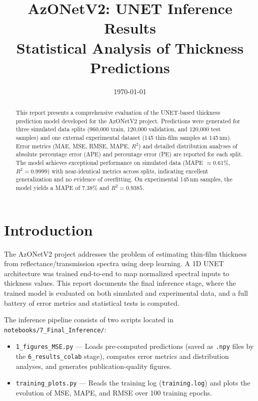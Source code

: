 \documentclass[11pt,a4paper]{article}
\title{AzONetV2: UNET Inference Results \\ {\normalsize Statistical Analysis of Thickness Predictions}}
\author{}
\date{\today}
\begin{document}
\maketitle

\begin{abstract}
This report presents a comprehensive evaluation of the UNET-based thickness prediction model developed for the AzONetV2 project. Predictions were generated for three simulated data splits (960,000 train, 120,000 validation, and 120,000 test samples) and one external experimental dataset (145 thin-film samples at 145\,nm). Error metrics (MAE, MSE, RMSE, MAPE, $R^2$) and detailed distribution analyses of absolute percentage error (APE) and percentage error (PE) are reported for each split. The model achieves exceptional performance on simulated data (MAPE $\approx 0.61\%$, $R^2 = 0.9999$) with near-identical metrics across splits, indicating excellent generalization and no evidence of overfitting. On experimental 145\,nm samples, the model yields a MAPE of 7.38\% and $R^2 = 0.9385$.
\end{abstract}

\setcounter{tocdepth}{1}
\tableofcontents
\newpage

\section{Introduction}

The AzONetV2 project addresses the problem of estimating thin-film thickness from reflectance/transmission spectra using deep learning. A 1D UNET architecture was trained end-to-end to map normalized spectral inputs to thickness values. This report documents the final inference stage, where the trained model is evaluated on both simulated and experimental data, and a full battery of error metrics and statistical tests is computed.

The inference pipeline consists of two scripts located in \texttt{notebooks/7\_Final\_Inference/}:

\begin{itemize}
  \item \texttt{1\_figures\_MSE.py} — Loads pre-computed predictions (saved as \texttt{.npy} files by the \texttt{6\_results\_colab} stage), computes error metrics and distribution analyses, and generates publication-quality figures.
  \item \texttt{training\_plots.py} — Reads the training log (\texttt{training.log}) and plots the evolution of MSE, MAPE, and RMSE over 100 training epochs.
\end{itemize}
\end{document}
